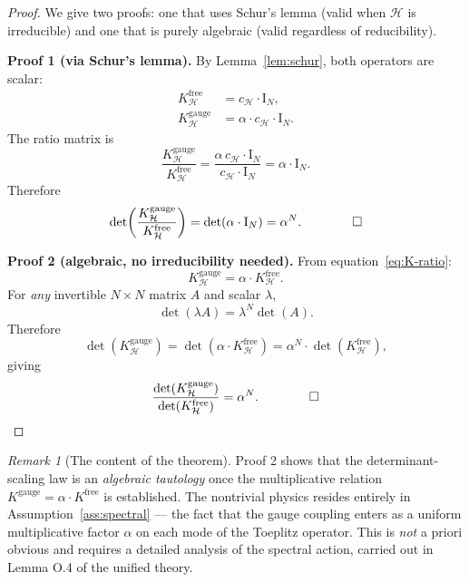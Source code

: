 \documentclass[11pt]{article}
\theoremstyle{definition}
\theoremstyle{remark}
\newtheorem*{remark}{Remark}
\newcommand{\Id}{\mathrm{I}}
\begin{document}
\begin{proof}
We give two proofs: one that uses Schur's lemma (valid when
$\mathcal{H}$ is irreducible) and one that is purely algebraic (valid
regardless of reducibility).

\medskip
\noindent\textbf{Proof 1 (via Schur's lemma).}
By Lemma~\ref{lem:schur}, both operators are scalar:
\begin{align}
K^{\mathrm{free}}_{\mathcal{H}} &= c_{\mathcal{H}} \cdot \Id_N, \\
K^{\mathrm{gauge}}_{\mathcal{H}} &= \alpha \cdot c_{\mathcal{H}} \cdot \Id_N.
\end{align}
The ratio matrix is
\begin{equation}
\frac{K^{\mathrm{gauge}}_{\mathcal{H}}}{K^{\mathrm{free}}_{\mathcal{H}}}
= \frac{\alpha \, c_{\mathcal{H}} \cdot \Id_N}{c_{\mathcal{H}} \cdot \Id_N}
= \alpha \cdot \Id_N.
\end{equation}
Therefore
\begin{equation}
\det\!\left(\frac{K^{\mathrm{gauge}}_{\mathcal{H}}}{K^{\mathrm{free}}_{\mathcal{H}}}\right)
= \det(\alpha \cdot \Id_N) = \alpha^N. \qquad \qed
\end{equation}

\medskip
\noindent\textbf{Proof 2 (algebraic, no irreducibility needed).}
From equation~\eqref{eq:K-ratio}:
\begin{equation}
K^{\mathrm{gauge}}_{\mathcal{H}} = \alpha \cdot K^{\mathrm{free}}_{\mathcal{H}}.
\end{equation}
For \textit{any} invertible $N \times N$ matrix $A$ and scalar $\lambda$,
\begin{equation}
\det(\lambda A) = \lambda^N \det(A).
\end{equation}
Therefore
\begin{equation}
\det(K^{\mathrm{gauge}}_{\mathcal{H}})
= \det(\alpha \cdot K^{\mathrm{free}}_{\mathcal{H}})
= \alpha^N \cdot \det(K^{\mathrm{free}}_{\mathcal{H}}),
\end{equation}
giving
\begin{equation}
\frac{\det(K^{\mathrm{gauge}}_{\mathcal{H}})}{\det(K^{\mathrm{free}}_{\mathcal{H}})}
= \alpha^N. \qquad \qed
\end{equation}
\end{proof}

\begin{remark}[The content of the theorem]
Proof 2 shows that the determinant-scaling law is an \textit{algebraic
tautology} once the multiplicative relation
$K^{\mathrm{gauge}} = \alpha \cdot K^{\mathrm{free}}$ is established.
The nontrivial physics resides entirely in Assumption~\ref{ass:spectral}
--- the fact that the gauge coupling enters as a uniform multiplicative
factor $\alpha$ on each mode of the Toeplitz operator. This is
\textit{not} a priori obvious and requires a detailed analysis of the
spectral action, carried out in Lemma O.4 of the unified theory.
\end{remark}
\end{document}

